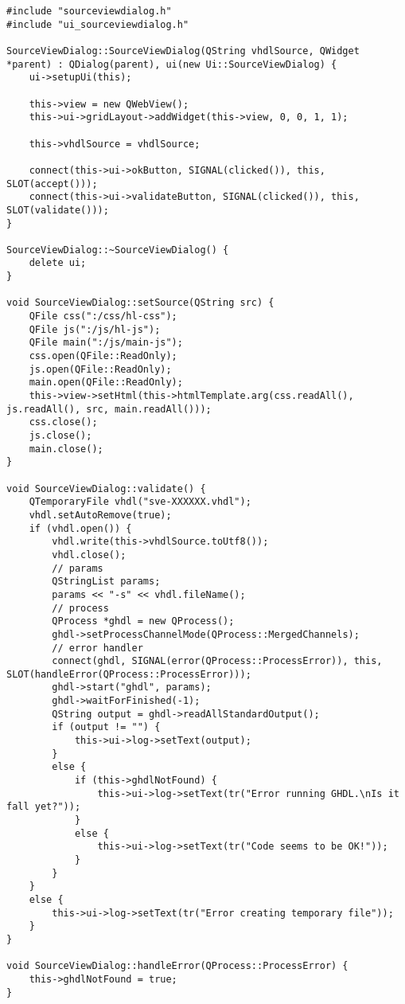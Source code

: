 \begin{lstlisting}
#include "sourceviewdialog.h"
#include "ui_sourceviewdialog.h"

SourceViewDialog::SourceViewDialog(QString vhdlSource, QWidget *parent) : QDialog(parent), ui(new Ui::SourceViewDialog) {
    ui->setupUi(this);

    this->view = new QWebView();
    this->ui->gridLayout->addWidget(this->view, 0, 0, 1, 1);

    this->vhdlSource = vhdlSource;

    connect(this->ui->okButton, SIGNAL(clicked()), this, SLOT(accept()));
    connect(this->ui->validateButton, SIGNAL(clicked()), this, SLOT(validate()));
}

SourceViewDialog::~SourceViewDialog() {
    delete ui;
}

void SourceViewDialog::setSource(QString src) {
    QFile css(":/css/hl-css");
    QFile js(":/js/hl-js");
    QFile main(":/js/main-js");
    css.open(QFile::ReadOnly);
    js.open(QFile::ReadOnly);
    main.open(QFile::ReadOnly);
    this->view->setHtml(this->htmlTemplate.arg(css.readAll(), js.readAll(), src, main.readAll()));
    css.close();
    js.close();
    main.close();
}

void SourceViewDialog::validate() {
    QTemporaryFile vhdl("sve-XXXXXX.vhdl");
    vhdl.setAutoRemove(true);
    if (vhdl.open()) {
        vhdl.write(this->vhdlSource.toUtf8());
        vhdl.close();
        // params
        QStringList params;
        params << "-s" << vhdl.fileName();
        // process
        QProcess *ghdl = new QProcess();
        ghdl->setProcessChannelMode(QProcess::MergedChannels);
        // error handler
        connect(ghdl, SIGNAL(error(QProcess::ProcessError)), this, SLOT(handleError(QProcess::ProcessError)));
        ghdl->start("ghdl", params);
        ghdl->waitForFinished(-1);
        QString output = ghdl->readAllStandardOutput();
        if (output != "") {
            this->ui->log->setText(output);
        }
        else {
            if (this->ghdlNotFound) {
                this->ui->log->setText(tr("Error running GHDL.\nIs it fall yet?"));
            }
            else {
                this->ui->log->setText(tr("Code seems to be OK!"));
            }
        }
    }
    else {
        this->ui->log->setText(tr("Error creating temporary file"));
    }
}

void SourceViewDialog::handleError(QProcess::ProcessError) {
    this->ghdlNotFound = true;
}
\end{lstlisting}~\\

